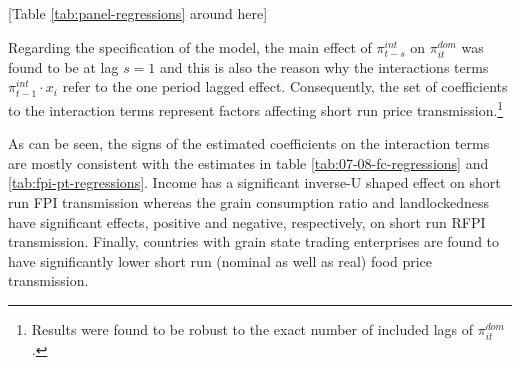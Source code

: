 \documentclass[12pt,english]{article}
\begin{document}
\begin{center}
[Table \ref{tab:panel-regressions} around here]
\par\end{center}

Regarding the specification of the model, the main effect of $\pi_{t-s}^{int}$ on $\pi_{it}^{dom}$ was found to be at lag $s=1$ and this is also the reason why the interactions terms $\pi_{t-1}^{int}\cdot x_{i} $ refer to the one period lagged effect. Consequently, the set of coefficients to the interaction terms represent factors affecting short run price transmission.\footnote{Results were found to be robust to the exact number of included lags of $\pi_{it}^{dom}$.}

As can be seen, the signs of the estimated coefficients on the interaction terms are mostly consistent with the estimates in table \ref{tab:07-08-fc-regressions} and \ref{tab:fpi-pt-regressions}. Income has a significant inverse-U shaped effect on short run FPI transmission whereas the grain consumption ratio and landlockedness have significant effects, positive and negative, respectively, on short run RFPI transmission. Finally, countries with grain state trading enterprises are found to have significantly lower short run (nominal as well as real) food price transmission.
\end{document}
